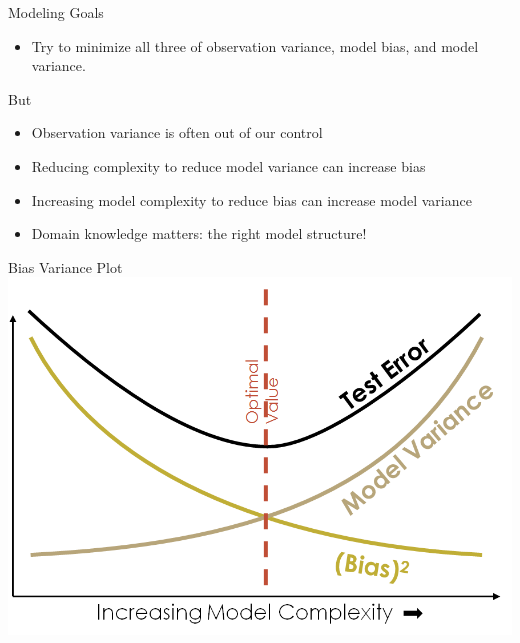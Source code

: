 \documentclass[aspectratio=169]{../latex_main/tntbeamer}  %
\begin{document}
	
	
		\begin{frame}[c]{Modeling Goals}
	    \begin{itemize}
	        \item Try to minimize all three of observation variance, model bias, and model variance.
	    \end{itemize}
	    But
	    \begin{itemize}
	        \item Observation variance is often out of our control
	        \item Reducing complexity to reduce model variance can increase bias
	        \item Increasing model complexity to reduce bias can increase model variance
	        \item Domain knowledge matters: the right model structure!
	    \end{itemize}
	\end{frame}
	
	
	\begin{frame}{Bias Variance Plot}
	    \centering
	    \includegraphics[scale=.4]{Bild14}
	\end{frame}
	
\end{document}
